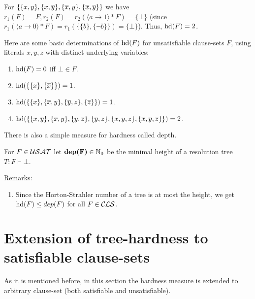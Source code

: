 \documentclass[]{book}
\begin{document}
\begin{examp}\label{exp:hardness1}
      For $\{ \{ x,y \},\{ x,\overline{y} \},\{ \overline{x},y \},\{ \overline{x},\overline{y} \} \}$ we have $r_1(F)=F, r_2(F)=r_2( \langle a \rightarrow 1 \rangle * F) = \{ \bot \}$
	  (since $r_1( \langle a \rightarrow 0 \rangle * F)=r_1 (\{\{ b \}, \{ \neg b \}\}) = \{ \bot \}$). Thus, $\operatorname{hd}(F) = 2$.
\end{examp}

\begin{examp}\label{exp:harducls}
  Here are some basic determinations of $\operatorname{hd}(F)$ for unsatisfiable clause-sets $F$, using literals $x,y,z$ with distinct underlying variables:
  \begin{enumerate}
  \item $\operatorname{hd}(F) = 0$ iff $\bot \in F$.
  \item $\operatorname{hd}(\{ \{ x \},\{ \overline{x} \} \}) = 1$.
  \item $\operatorname{hd}(\{ \{ x \},\{ \overline{x},y \}, \{ \overline{y},z \}, \{ \overline{z} \} \}) = 1$.
  \item $\operatorname{hd}(\{ \{ x,\overline{y} \},\{ \overline{x},y \},\{ y,\overline{z} \},\{ \overline{y},z \},\{ x,y,z \},\{ \overline{x},\overline{y},\overline{z} \} \}) = 2$.
  \end{enumerate}
\end{examp}
There is also a simple measure for hardness called depth.
\begin{defi}\label{def:hardness2}
      \cite{h5} For $F \in \mathcal{USAT}$ let $\textbf{dep(F)} \in \mathbb{N}_0$ be the minimal height of a resolution tree $T : F \vdash \bot$.
\end{defi}

Remarks:
\begin{enumerate}
  \item Since the Horton-Strahler number of a tree is at most the height, we get $\operatorname{hd}(F) \le dep(F)$ for all $F \in \mathcal{CLS}$.
\end{enumerate}
\section{Extension of tree-hardness to satisfiable clause-sets}
\label{sec:extension_Hardness}

As it is mentioned before, in this section the hardness measure is extended to arbitrary clause-set (both satisfiable and unsatisfiable). 
\end{document}
